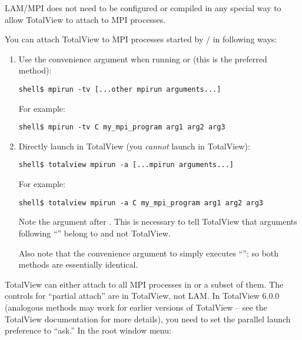 LAM/MPI does not need to be configured or compiled in any special way
to allow TotalView to attach to MPI processes.

You can attach TotalView to MPI processes started by  /
 in following ways:

\begin{enumerate}
\item Use the  convenience argument when running
   or  (this is the preferred method):

  \lstset{style=lam-cmdline}
  \begin{lstlisting}
shell$ mpirun -tv [...other mpirun arguments...]
  \end{lstlisting}

  For example:
  
  \lstset{style=lam-cmdline}
  \begin{lstlisting}
shell$ mpirun -tv C my_mpi_program arg1 arg2 arg3
  \end{lstlisting}

\item Directly launch  in TotalView (you {\em cannot}
  launch  in TotalView):
  
  \lstset{style=lam-cmdline}
  \begin{lstlisting}
shell$ totalview mpirun -a [...mpirun arguments...]
  \end{lstlisting}
  
  For example:
  
  \lstset{style=lam-cmdline}
  \begin{lstlisting}
shell$ totalview mpirun -a C my_mpi_program arg1 arg2 arg3
  \end{lstlisting}
  
  Note the  argument after .  This is necessary
  to tell TotalView that arguments following ``'' belong to
   and not TotalView.
  
  Also note that the  convenience argument to 
  simply executes ``''; so both methods
  are essentially identical.
\end{enumerate}
        
TotalView can either attach to all MPI processes in
 or a subset of them.  The controls for
``partial attach'' are in TotalView, not LAM.  In TotalView 6.0.0
(analogous methods may work for earlier versions of TotalView -- see
the TotalView documentation for more details), you need to set the
parallel launch preference to ``ask.''  In the root window menu:

